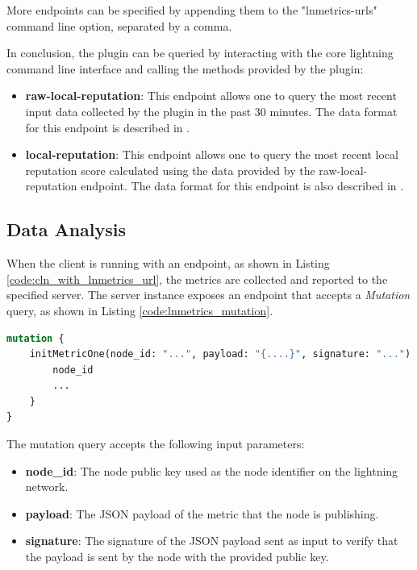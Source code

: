 More endpoints can be specified by appending them to the "lnmetrics-urls" command line option, separated by a comma.

In conclusion, the plugin can be queried by interacting with the core lightning 
command line interface and calling the methods provided by the plugin:

\begin{itemize}
    \item {\bf raw-local-reputation}: This endpoint allows one to query the most recent input data 
        collected by the plugin in the past 30 minutes. The data format for this endpoint 
        is described in \cite{lnmetrics_localreputation}.
    \item {\bf local-reputation}: This endpoint allows one to query the most recent local 
        reputation score calculated using the data provided by the raw-local-reputation 
        endpoint. The data format for this endpoint is also described in \cite{lnmetrics_localreputation}.
\end{itemize}

\subsection{Data Analysis}

When the client is running with an endpoint, as shown in Listing \ref{code:cln_with_lnmetrics_url}, the metrics are 
collected and reported to the specified server. The server instance exposes an endpoint that accepts a \emph{Mutation} 
query, as shown in Listing \ref{code:lnmetrics_mutation}.

\begin{lstlisting}[language=graphql, basicstyle=\small,
                  caption={Mutation query call by the client to initialise the metric on the server.}, 
                  label={code:lnmetrics_mutation}]
mutation {
    initMetricOne(node_id: "...", payload: "{....}", signature: "...") {
        node_id
        ...
    }
}
\end{lstlisting}

The mutation query accepts the following input parameters:

\begin{itemize}
    \item {\bf node\_id}: The node public key used as the node identifier on the lightning network.
    \item {\bf payload}: The JSON payload of the metric that the node is publishing.
    \item {\bf signature}: The signature of the JSON payload sent as input to verify that the
        payload is sent by the node with the provided public key.
\end{itemize}

